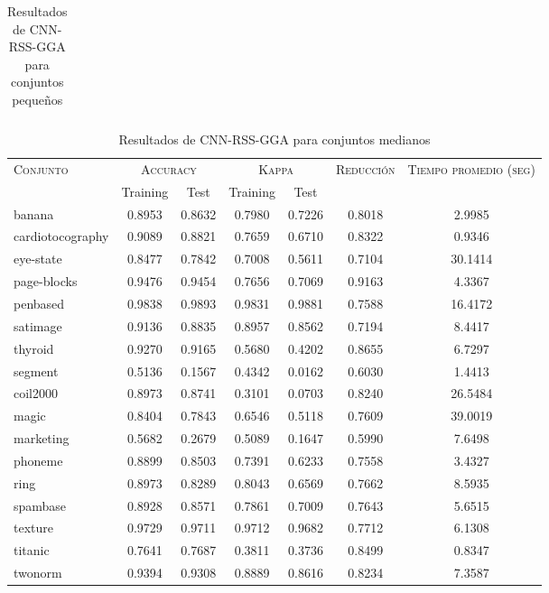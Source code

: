 \begin{table}[]
\begin{tabular}{l c c c c c c}
\hline
\end{tabular}
\caption{Resultados de CNN-RSS-GGA para conjuntos pequeños }
\label{res-peq-cnn-rss-gga}
\end{table}



\begin{table}[]
\centering
\begin{tabular}{l c c c c c c}
\hline
\multirow{2}{*}{\textsc{Conjunto}}
	& \multicolumn{2}{c}{\textsc{Accuracy}}
	& \multicolumn{2}{c}{\textsc{Kappa}}
	& \textsc{Reducción}
	& \textsc{Tiempo promedio (seg)} \\
	& Training & Test
	& Training & Test \\ 
\hline
\hline

banana & 0.8953 & 0.8632 & 0.7980 & 0.7226 & 0.8018 & 2.9985 \\
cardiotocography & 0.9089 & 0.8821 & 0.7659 & 0.6710 & 0.8322 & 0.9346 \\
eye-state & 0.8477 & 0.7842 & 0.7008 & 0.5611 & 0.7104 & 30.1414 \\
page-blocks & 0.9476 & 0.9454 & 0.7656 & 0.7069 & 0.9163 & 4.3367 \\
penbased & 0.9838 & 0.9893 & 0.9831 & 0.9881 & 0.7588 & 16.4172 \\
satimage & 0.9136 & 0.8835 & 0.8957 & 0.8562 & 0.7194 & 8.4417 \\
thyroid & 0.9270 & 0.9165 & 0.5680 & 0.4202 & 0.8655 & 6.7297 \\
segment & 0.5136 & 0.1567 & 0.4342 & 0.0162 & 0.6030 & 1.4413 \\
coil2000 & 0.8973 & 0.8741 & 0.3101 & 0.0703 & 0.8240 & 26.5484 \\
magic & 0.8404 & 0.7843 & 0.6546 & 0.5118 & 0.7609 & 39.0019 \\
marketing & 0.5682 & 0.2679 & 0.5089 & 0.1647 & 0.5990 & 7.6498 \\
phoneme & 0.8899 & 0.8503 & 0.7391 & 0.6233 & 0.7558 & 3.4327 \\
ring & 0.8973 & 0.8289 & 0.8043 & 0.6569 & 0.7662 & 8.5935 \\
spambase & 0.8928 & 0.8571 & 0.7861 & 0.7009 & 0.7643 & 5.6515 \\
texture & 0.9729 & 0.9711 & 0.9712 & 0.9682 & 0.7712 & 6.1308 \\
titanic & 0.7641 & 0.7687 & 0.3811 & 0.3736 & 0.8499 & 0.8347 \\
twonorm & 0.9394 & 0.9308 & 0.8889 & 0.8616 & 0.8234 & 7.3587 \\

\hline
\end{tabular}
\caption{Resultados de CNN-RSS-GGA para conjuntos medianos }
\label{res-med-cnn-rss-gga}
\end{table}



